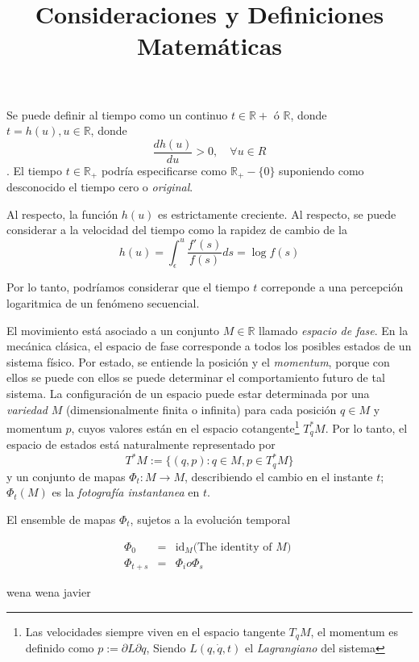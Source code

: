 \documentclass[12pt]{article}
\title{Consideraciones y Definiciones Matemáticas}
\newcommand{\R}{\ensuremath{\mathbb{R}}}
\begin{document}
\maketitle

Se puede definir al tiempo como un continuo $t \in \R+$ ó $\R$, donde $t = h(u), u \in
\R$, donde $$\frac{dh(u)}{du} > 0, \quad \forall u \in R$$. El tiempo $t \in
\R_+$ podría especificarse como $\R_+ - \{0\}$ suponiendo como desconocido el
tiempo cero o \textit{original}.

Al respecto, la función $h(u)$ es estrictamente creciente. Al respecto, se puede
considerar a la velocidad del tiempo como la rapidez de cambio de la 
$$
	h(u) = \int_{\epsilon}^{u} \frac{f'(s)}{f(s)}ds = \log f(s) 
$$

Por lo tanto, podríamos considerar que el tiempo $t$ correponde a una percepción
logaritmica de un fenómeno secuencial. 

El movimiento está asociado a un conjunto $M \in \R$ llamado \textit{espacio de
fase}.
En la mecánica clásica, el espacio de fase corresponde a todos los posibles
estados de un sistema físico.
Por estado, se entiende la posición y el \textit{momentum}, porque con ellos se
puede con ellos se puede determinar el comportamiento futuro de tal sistema.
La configuración de un espacio puede estar determinada por una \textit{variedad}
$M$ (dimensionalmente finita o infinita) para cada posición $q \in M$ y momentum
$p$, cuyos valores están en el espacio cotangente\footnote{Las velocidades
siempre viven en el espacio tangente $T_q M$, el momentum es definido como $p :=
\partial L  \partial q $, Siendo $L(q, \dot{q}, t)$ el \textit{Lagrangiano} del sistema}  $T_q^*M$. Por lo tanto, el
espacio de estados está naturalmente representado  por
$$
	T^* M := \{ (q, p) : q \in M, p \in T_q^* M \}
$$
y un conjunto de mapas $\Phi_t: M \rightarrow M$, describiendo el cambio en el
instante $t$; $\Phi_t(M)$ es la \textit{fotografía instantanea} en $t$.

El ensemble de mapas $\Phi_t$, sujetos a la evolución temporal

\begin{eqnarray}
	\Phi_0 &=& \text{id}_M \text{(The identity of $M$) } \\
	\Phi_{t+s} &=& \Phi_i o \Phi_s
\end{eqnarray}

wena wena javier 
 
\end{document}
